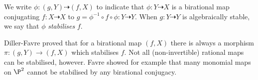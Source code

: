 \documentclass[11pt, final]{amsart}
\newcommand{\dashto}{\dashrightarrow}
\begin{document}
\begin{defn}
 We write $\phi : (g, Y) \dashto (f, X)$ to indicate that $\phi : Y \dashto X$ is a birational map conjugating $f : X \dashto X$ to $g = \phi^{-1} \circ f \circ \phi : Y \dashto Y$. When $g : Y \dashto Y$ is algebraically stable, we say that $\phi$ \emph{stabilises} $f$.
\end{defn}

%
Diller-Favre \cite{DF} proved that for a birational map $(f, X)$ there is always a morphism $\pi : (g, Y) \to (f, X)$ which stabilises $f$. %
%
%
Not all (non-invertible) rational maps can be stabilised, however. Favre \cite{Fav} showed for example that many monomial maps on $\P^2$ cannot be stabilised by any birational conjugacy.%
\end{document}
